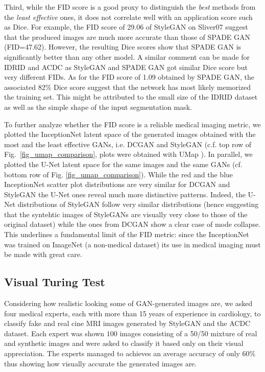 \documentclass[preprint,12pt, authoryear]{elsarticle}
\begin{document}
Third, while the FID score is a good proxy to distinguish the {\em best} methods from the {\em least effective} ones, it does not correlate well with an application score such as Dice.  For example, the FID score of 29.06 of StyleGAN on Sliver07 suggest that the produced images are much more accurate than those of SPADE GAN (FID=47.62).  However, the resulting Dice scores show that SPADE GAN is significantly better than any other model.  A similar comment can be made for IDRID and ACDC as StyleGAN and SPADE GAN got similar Dice score but very different FIDs.
 As for the FID score of 1.09 obtained by SPADE GAN, the associated 82\%  Dice score suggest that the network has most likely memorized the training set. This might be attributed to the small size of the IDRID dataset as well as the simple shape of the input segmentation mask.



To further analyze whether the FID score is a reliable medical imaging metric, we plotted the InceptionNet latent space of the  generated images obtained with the most and the least effective GANs, i.e. DCGAN and StyleGAN (c.f. top row of Fig.~\ref{fig_umap_comparison}, plots were obtained with UMap \citep{McInnes2018UMAPUM}).  
In parallel, we plotted the U-Net latent space for the same images and the same GANs (cf. bottom row of Fig. \ref{fig_umap_comparison}). While the red and the blue InceptionNet scatter plot distributions are very similar for DCGAN and StyleGAN the U-Net ones reveal much more distinctive patterns.  Indeed, the U-Net distributions of  StyleGAN follow very similar distributions (hence suggesting that the syntehtic images of StyleGANs are visually very close to those of the original dataset) while the ones from DCGAN show a clear case of mode collapse.  This underlines a fundamental limit of the FID metric: since the InceptionNet was trained on ImageNet (a non-medical dataset) its use in medical imaging must be made with great care.

\subsection{Visual Turing Test}
Considering how realistic looking some of GAN-generated images are, we asked four medical experts, each with more than 15 years of experience in cardiology, to classify fake and real cine MRI images generated by StyleGAN and the ACDC dataset.  Each expert was shown $100$ images consisting of a 50/50 mixture of real and synthetic images and were asked to classify it based only on their visual appreciation.  The experts managed to achieves an average accuracy of only 60\% thus showing how visually accurate the generated images are.
\end{document}
